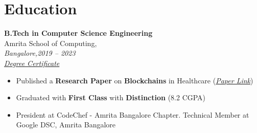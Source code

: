 \documentclass[a4paper,8pt]{article}
\begin{document}
\section*{\faGraduationCap\hspace{0.5em}Education}

\textbf{B.Tech in Computer Science Engineering} \\
{Amrita School of Computing},  \\ \textit{Bangalore,2019 -- 2023} \\
\textit{\href{https://drive.google.com/drive/folders/1Hu5mrXyz4nnYDJhT7x9IuLwLyBzCwkKB}{Degree Certificate}}
\begin{itemize}[leftmargin=1.5em]
    \item Published a \textbf{Research Paper} on \textbf{Blockchains} in Healthcare (\textit{\href{https://papers.ssrn.com/sol3/papers.cfm?abstract_id=4804243}{Paper Link}})
    \item Graduated with \textbf{First Class} with \textbf{Distinction} (8.2 CGPA)
    \item President at CodeChef - Amrita Bangalore Chapter. Technical Member at Google DSC, Amrita Bangalore
\end{itemize}
\end{document}
